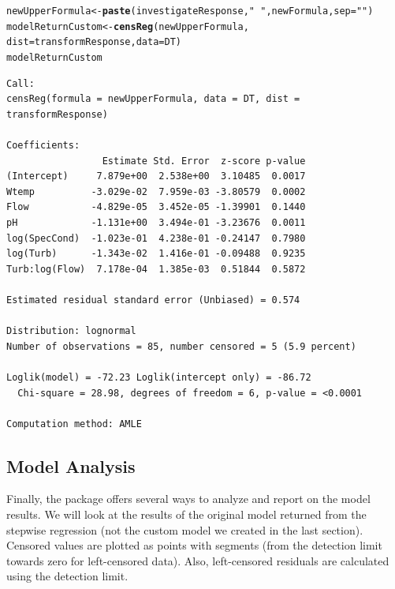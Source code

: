\documentclass[a4paper,11pt]{article}\usepackage[]{graphicx}\usepackage[]{color}
\makeatletter
\newcommand{\hlstr}[1]{\textcolor[rgb]{0.192,0.494,0.8}{#1}}%
\newcommand{\hlstd}[1]{\textcolor[rgb]{0.345,0.345,0.345}{#1}}%
\newcommand{\hlkwb}[1]{\textcolor[rgb]{0.69,0.353,0.396}{#1}}%
\newcommand{\hlkwc}[1]{\textcolor[rgb]{0.333,0.667,0.333}{#1}}%
\newcommand{\hlkwd}[1]{\textcolor[rgb]{0.737,0.353,0.396}{\textbf{#1}}}%
\newenvironment{kframe}{%
 \def\at@end@of@kframe{}%
 \ifinner\ifhmode%
  \def\at@end@of@kframe{\end{minipage}}%
  \begin{minipage}{\columnwidth}%
 \fi\fi%
 \def\FrameCommand##1{\hskip\@totalleftmargin \hskip-\fboxsep
 \colorbox{shadecolor}{##1}\hskip-\fboxsep
     \hskip-\linewidth \hskip-\@totalleftmargin \hskip\columnwidth}%
 \MakeFramed {\advance\hsize-\width
   \@totalleftmargin\z@ \linewidth\hsize
   \@setminipage}}%
 {\par\unskip\endMakeFramed%
 \at@end@of@kframe}
\newenvironment{knitrout}{}{} %
\makeatother
\begin{document}
\begin{knitrout}
\color{fgcolor}\begin{kframe}
\begin{alltt}
\hlstd{newUpperFormula} \hlkwb{<-} \hlkwd{paste}\hlstd{(investigateResponse,}\hlstr{" ~ "}\hlstd{, newFormula,} \hlkwc{sep}\hlstd{=}\hlstr{""}\hlstd{)}
\hlstd{modelReturnCustom} \hlkwb{<-} \hlkwd{censReg}\hlstd{(newUpperFormula,}
                       \hlkwc{dist}\hlstd{=transformResponse,} \hlkwc{data}\hlstd{=DT)}
\hlstd{modelReturnCustom}
\end{alltt}
\begin{verbatim}
Call:
censReg(formula = newUpperFormula, data = DT, dist = transformResponse)

Coefficients:
                 Estimate Std. Error  z-score p-value
(Intercept)     7.879e+00  2.538e+00  3.10485  0.0017
Wtemp          -3.029e-02  7.959e-03 -3.80579  0.0002
Flow           -4.829e-05  3.452e-05 -1.39901  0.1440
pH             -1.131e+00  3.494e-01 -3.23676  0.0011
log(SpecCond)  -1.023e-01  4.238e-01 -0.24147  0.7980
log(Turb)      -1.343e-02  1.416e-01 -0.09488  0.9235
Turb:log(Flow)  7.178e-04  1.385e-03  0.51844  0.5872

Estimated residual standard error (Unbiased) = 0.574

Distribution: lognormal
Number of observations = 85, number censored = 5 (5.9 percent)

Loglik(model) = -72.23 Loglik(intercept only) = -86.72
  Chi-square = 28.98, degrees of freedom = 6, p-value = <0.0001

Computation method: AMLE
\end{verbatim}
\end{kframe}
\end{knitrout}


\subsection{Model Analysis}
Finally, the package offers several ways to analyze and report on the model results. We will look at the results of the original model returned from the stepwise regression (not the custom model we created in the last section). Censored values are plotted as points with segments (from the detection limit towards zero for left-censored data). Also, left-censored residuals are calculated using the detection limit.
\end{document}
